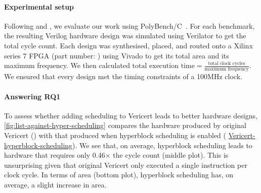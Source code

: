 \newcommand\VericertList{%
\setul{-1pt}{3pt}\setulcolor{colorVericertListLIGHT}%
{\ul{\textsf{Vericert-list-scheduling}}}}

\newcommand\VericertHyper{%
\setul{-1pt}{3pt}\setulcolor{colorVericertHyperLIGHT}%
{\ul{\textsf{Vericert-hyperblock-scheduling}}}}

\begin{figure*}
  \centering
  \resizebox{\linewidth}{!}{}
  \caption[Results of simulating and synthesising the PolyBench/C benchmark suite using a range of HLS tools. All figures are relative to Bambu.]{Results of simulating and synthesising the PolyBench/C benchmark suite using a range of HLS tools. All figures are relative to \BambuDefault{}.}%
  \label{fig:list-against-hyper-scheduling}
\end{figure*}

\paragraph{Experimental setup}
Following \textcite{herklotz21_fvhls} and
\textcite{six22_formal_verif_super_sched}, we evaluate our work using
PolyBench/C~\cite{pouchet20_polyb_c}. For each benchmark, the resulting Verilog
hardware design was simulated using Verilator to get the total cycle count. Each
design was synthesised, placed, and routed onto a Xilinx series 7 FPGA (part
number: ) using Vivado to get its total area and its
maximum frequency.  We then calculated
$\text{total execution time} = \frac{\text{total clock cycles}}{\text{maximum
    frequency}}$.  We ensured that every design met the timing constraints of a
100MHz clock.

\paragraph{Answering RQ1}
To assess whether adding scheduling to Vericert leads to better hardware designs, \cref{fig:list-against-hyper-scheduling} compares the hardware produced by original Vericert (\VericertBase{}) with that produced when hyperblock scheduling is enabled (\VericertHyper{}). We see that, on average, hyperblock scheduling leads to hardware that requires only 0.46$\times$ the cycle count (middle plot). This is unsurprising given that original Vericert only executed a single instruction per clock cycle. In terms of area (bottom plot), hyperblock scheduling has, on average, a slight increase in area.

